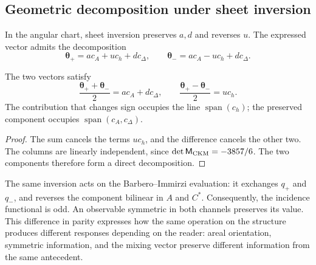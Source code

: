 \subsection{Geometric decomposition under sheet inversion}
\label{sec:ii09-descomposicion-paridad}

In the angular chart, sheet inversion preserves \(a,d\) and
reverses \(u\). The expressed vector admits the decomposition
\[
 \boldsymbol\theta_+=a c_A+u c_h+d c_\Delta,
 \qquad
 \boldsymbol\theta_-=a c_A-u c_h+d c_\Delta.
\]
\begin{proposition}
\label{prop:ii09-paridad-angular}
The two vectors satisfy
\[
 \frac{\boldsymbol\theta_++\boldsymbol\theta_-}{2}
       =a c_A+d c_\Delta,\qquad
 \frac{\boldsymbol\theta_+-\boldsymbol\theta_-}{2}=u c_h.
\]
The contribution that changes sign occupies the line
\(\operatorname{span}(c_h)\); the preserved component occupies
\(\operatorname{span}(c_A,c_\Delta)\).
\end{proposition}
\begin{proof}
The sum cancels the terms \(u c_h\), and the difference cancels
the other two. The columns are linearly independent, since
\(\det\mathsf M_{\rm CKM}=-3857/6\). The two components therefore
form a direct decomposition.
\end{proof}

The same inversion acts on the Barbero--Immirzi evaluation:
it exchanges \(q_+\) and \(q_-\), and reverses the component bilinear
in \(A\) and \(C^*\). Consequently, the incidence functional
is odd. An observable symmetric in both channels preserves its
value. This difference in parity expresses how the same
operation on the structure produces different responses depending
on the reader: areal orientation, symmetric information, and the
mixing vector preserve different information from the same antecedent.

